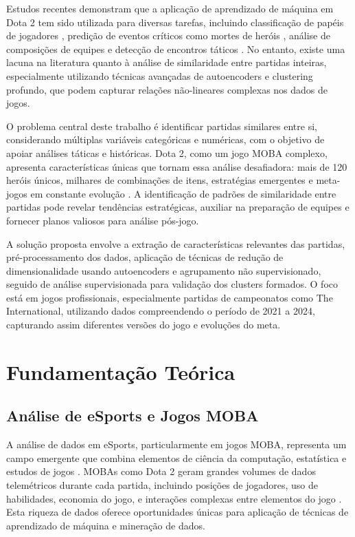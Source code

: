 \documentclass[12pt]{article}
\begin{document}
Estudos recentes demonstram que a aplicação de aprendizado de máquina em Dota 2 tem sido utilizada para diversas tarefas, incluindo classificação de papéis de jogadores \cite{eggert2015classification}, predição de eventos críticos como mortes de heróis \cite{katona2019time}, análise de composições de equipes \cite{cadman2024studying} e detecção de encontros táticos \cite{schubert2016esports}. No entanto, existe uma lacuna na literatura quanto à análise de similaridade entre partidas inteiras, especialmente utilizando técnicas avançadas de autoencoders e clustering profundo, que podem capturar relações não-lineares complexas nos dados de jogos.

O problema central deste trabalho é identificar partidas similares entre si, considerando múltiplas variáveis categóricas e numéricas, com o objetivo de apoiar análises táticas e históricas. Dota 2, como um jogo MOBA complexo, apresenta características únicas que tornam essa análise desafiadora: mais de 120 heróis únicos, milhares de combinações de itens, estratégias emergentes e meta-jogos em constante evolução \cite{Font2019Dota2B}. A identificação de padrões de similaridade entre partidas pode revelar tendências estratégicas, auxiliar na preparação de equipes e fornecer planos valiosos para análise pós-jogo.

A solução proposta envolve a extração de características relevantes das partidas, pré-processamento dos dados, aplicação de técnicas de redução de dimensionalidade usando autoencoders e agrupamento não supervisionado, seguido de análise supervisionada para validação dos clusters formados. O foco está em jogos profissionais, especialmente partidas de campeonatos como The International, utilizando dados compreendendo o período de 2021 a 2024, capturando assim diferentes versões do jogo e evoluções do meta.

\section{Fundamentação Teórica}

\subsection{Análise de eSports e Jogos MOBA}

A análise de dados em eSports, particularmente em jogos MOBA, representa um campo emergente que combina elementos de ciência da computação, estatística e estudos de jogos \cite{drachen2016esports}. MOBAs como Dota 2 geram grandes volumes de dados telemétricos durante cada partida, incluindo posições de jogadores, uso de habilidades, economia do jogo, e interações complexas entre elementos do jogo \cite{kamal2025machine}. Esta riqueza de dados oferece oportunidades únicas para aplicação de técnicas de aprendizado de máquina e mineração de dados.
\end{document}
